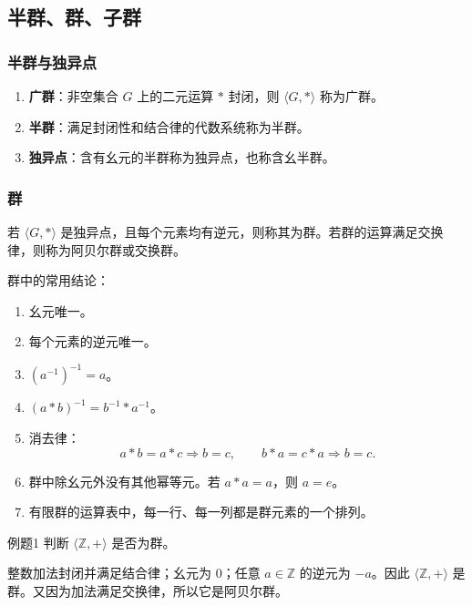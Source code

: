 \subsection{半群、群、子群}

\subsubsection{半群与独异点}

\begin{enumerate}
	\item \textbf{广群}：非空集合 \(G\) 上的二元运算 \(*\) 封闭，则 \(\langle G,*\rangle\) 称为广群。
	\item \textbf{半群}：满足封闭性和结合律的代数系统称为半群。
	\item \textbf{独异点}：含有幺元的半群称为独异点，也称含幺半群。
\end{enumerate}

\subsubsection{群}

若 \(\langle G,*\rangle\) 是独异点，且每个元素均有逆元，则称其为群。若群的运算满足交换律，则称为阿贝尔群或交换群。

群中的常用结论：
\begin{enumerate}
	\item 幺元唯一。
	\item 每个元素的逆元唯一。
	\item \((a^{-1})^{-1}=a\)。
	\item \((a*b)^{-1}=b^{-1}*a^{-1}\)。
	\item 消去律：
	\[
	a*b=a*c\Rightarrow b=c,\qquad b*a=c*a\Rightarrow b=c.
	\]
	\item 群中除幺元外没有其他幂等元。若 \(a*a=a\)，则 \(a=e\)。
	\item 有限群的运算表中，每一行、每一列都是群元素的一个排列。
\end{enumerate}

\begin{question}{例题1}
	判断 \(\langle\mathbb{Z},+\rangle\) 是否为群。
	
	\begin{solution}
	整数加法封闭并满足结合律；幺元为 \(0\)；任意 \(a\in\mathbb{Z}\) 的逆元为 \(-a\)。因此 \(\langle\mathbb{Z},+\rangle\) 是群。又因为加法满足交换律，所以它是阿贝尔群。
	\end{solution}
\end{question}

